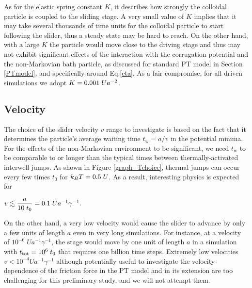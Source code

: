 As for the elastic spring constant $K$, it describes how strongly the colloidal particle is coupled to the sliding stage. 
A very small value of $K$ implies that it may take several thousands of time units for the colloidal particle to start following the slider, thus a steady state may be hard to reach. On the other hand, with a large $K$ the particle would move close to the driving stage and thus may not exhibit significant effects of the interaction with the corrugation potential and the non-Markovian bath particle, as discussed for standard PT model in Section \ref{PTmodel}, and specifically around Eq.\eqref{eta}. As a fair compromise, for all driven simulations we adopt $K=0.001\hspace{0.1cm}Ua^{-2}$.
\subsection{Velocity}
The choice of the slider velocity $v$ range to investigate is based on the fact that it determines the particle's average waiting time $t_\text{w} = a/v$ in the potential minima. For the effects of the non-Markovian environment to be significant, we need $t_\text{w}$ to be comparable to or longer than the typical times between thermally-activated interwell jumps. As shown in Figure \ref{graph_Tchoice}, thermal jumps can occur every few times $t_0$ for $k_BT=0.5\hspace{0.1cm}U$. As a result, interesting physics is expected for 
\begin{center}
    $v \lesssim \dfrac{a}{10\hspace{0.1cm}t_0} = 0.1 \hspace{0.1cm} U a^{-1}\gamma^{-1}.$
\end{center}
On the other hand, a very low velocity would cause the slider to advance by only a few units of length $a$ even in very long simulations. For instance, at a velocity of $10^{-6}\; Ua^{-1}\gamma^{-1}$, the stage would move by one unit of length $a$ in a simulation with $t_\text{tot}=10^6\hspace{0.1cm}t_0$ that requires one billion time steps.
Extremely low velocities $v < 10^{-4} Ua^{-1}\gamma^{-1}$ although potentially useful to investigate the velocity-dependence of the friction force in the PT model and in its extension are too challenging for this preliminary study, and we will not attempt them.